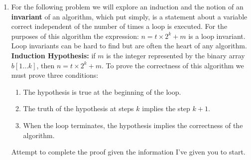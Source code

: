 \documentclass[12pt]{article}
\begin{document}
\begin{enumerate}
\item For the following problem we will explore an induction and the
notion of an \textbf{invariant} of an algorithm, which put simply, is a statement about
a variable correct independent of the number of times a loop is executed. For the purposes of 
this algorithm the expression: $n = t \times 2^k + m$ is a loop invariant. Loop invariants can 
be hard to find but are often the heart of any algorithm.\\
\textbf{Induction Hypothesis: } if $m$ is the integer represented by 
the binary array $b[1\dots k]$, then $n = t \times 2^k + m$. To prove the 
correctness of this algorithm we must prove three conditions:
\begin{enumerate}
\item The hypothesis is true at the beginning of the loop.
\item The truth of the hypothesis at steps $k$ implies the step $k+1$.
\item When the loop terminates, the hypothesis implies the correctness of the algorithm.
\end{enumerate}
Attempt to complete the proof given the information I've given you to start. 
\end{enumerate}
\end{document}
